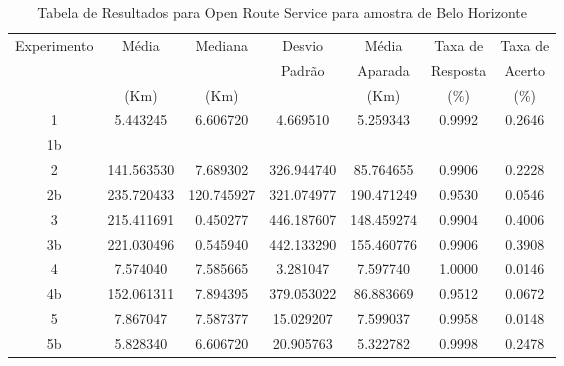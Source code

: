 \begin{anexosenv}
\begin{table}[ht]
\centering
\begin{tabular}{|c|c|c|c|c|c|c|}
\hline
Experimento & Média & Mediana & Desvio & Média & Taxa de & Taxa de \\
 & & & Padrão & Aparada & Resposta & Acerto \\
 & (Km) & (Km) & & (Km) & (\%) & (\%) \\ \hline
1 & 5.443245 & 6.606720 & 4.669510 & 5.259343 & 0.9992 & 0.2646 \\ \hline
1b &  &  &  &  &  &  \\ \hline
2 & 141.563530 & 7.689302 & 326.944740 & 85.764655 & 0.9906 & 0.2228 \\ \hline
2b & 235.720433 & 120.745927 & 321.074977 & 190.471249 & 0.9530 & 0.0546 \\ \hline
3 & 215.411691 & 0.450277 & 446.187607 & 148.459274 & 0.9904 & 0.4006 \\ \hline
3b & 221.030496 & 0.545940 & 442.133290 & 155.460776 & 0.9906 & 0.3908 \\ \hline
4 & 7.574040 & 7.585665 & 3.281047 & 7.597740 & 1.0000 & 0.0146 \\ \hline
4b & 152.061311 & 7.894395 & 379.053022 & 86.883669 & 0.9512 & 0.0672 \\ \hline
5 & 7.867047 & 7.587377 & 15.029207 & 7.599037 & 0.9958 & 0.0148 \\ \hline
5b & 5.828340 & 6.606720 & 20.905763 & 5.322782 & 0.9998 & 0.2478 \\ \hline
\end{tabular}
\caption{Tabela de Resultados para Open Route Service para amostra de Belo Horizonte}
\label{tab:orsBH}
\end{table}





\end{anexosenv}
